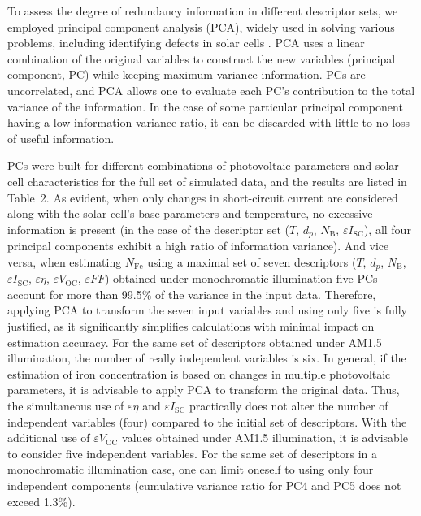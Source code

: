 \documentclass[a4paper,fleqn]{cas-sc}
\begin{document}
\begin{mdframed}
To assess the \textcolor[rgb]{1.00,0.07,0.00}{degree} of redundancy information
\textcolor[rgb]{1.00,0.07,0.00}{in different descriptor sets, we employed} principal component analysis (PCA),
widely used in solving various problems, including identifying defects in solar cells \cite{Fadhel2019}.
PCA uses a linear combination of the original variables to \textcolor[rgb]{1.00,0.07,0.00}{construct} the new variables (principal component, PC) while keeping maximum variance information.
PCs are \textcolor[rgb]{1.00,0.07,0.00}{uncorrelated, and PCA allows one to evaluate each PC’s contribution to the total variance of the information.}
In the case of some particular principal component having a low information variance ratio, it can be discarded with little to no loss of useful information.

PCs were built for different combinations of photovoltaic parameters and solar cell characteristics
for the full set of simulated data, and the results are listed in Table~2.
As evident, when only changes in short-circuit current are considered along with the solar cell's base parameters and temperature,
no excessive information is present \textcolor[rgb]{1.00,0.07,0.00}{(in the case of the descriptor set ($T$, $d_p$, $N_\mathrm{B}$, $\varepsilon I_\mathrm{SC}$),
all four principal components exhibit a high ratio of information variance)}.
\textcolor[rgb]{1.00,0.07,0.00}{And vice versa, when estimating $N_\mathrm{Fe}$ using a maximal set of
seven descriptors ($T$, $d_p$, $N_\mathrm{B}$, $\varepsilon I_\mathrm{SC}$, $\varepsilon \eta$, $\varepsilon V_\mathrm{OC}$, $\varepsilon F\!F$)
obtained under monochromatic illumination five PCs account for more than 99.5\% of the variance in the input data.
Therefore, applying PCA to transform the seven input variables and using only five is fully justified,
as it significantly simplifies calculations with minimal impact on estimation accuracy.
For the same set of descriptors obtained under AM1.5 illumination,
the number of really independent variables is six.
In general, if the estimation of iron concentration is based on changes in multiple photovoltaic parameters,
it is advisable to apply PCA to transform the original data.
Thus, the simultaneous use of $\varepsilon \eta$ and $\varepsilon I_\mathrm{SC}$ practically does not alter
the number of independent variables (four) compared to the initial set of descriptors.}
With the additional use of $\varepsilon V_\mathrm{OC}$ values obtained under AM1.5 illumination, it is advisable to consider five independent variables.
For the same set of descriptors in a monochromatic illumination case, one can limit oneself to using only four independent components
(cumulative variance ratio for PC4 and PC5 does not exceed 1.3\%).
\end{mdframed}
\end{document}
